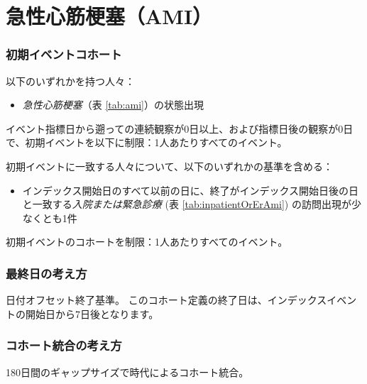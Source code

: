 \documentclass[
  11pt]{book}
\providecommand{\tightlist}{%
  \setlength{\itemsep}{0pt}\setlength{\parskip}{0pt}}
\theoremstyle{definition}
\theoremstyle{definition}
\theoremstyle{definition}
\theoremstyle{definition}
\theoremstyle{remark}
\begin{document}
\section{急性心筋梗塞（AMI）}\label{Ami}

\subsubsection*{初期イベントコホート}\label{ux521dux671fux30a4ux30d9ux30f3ux30c8ux30b3ux30dbux30fcux30c8-1}

以下のいずれかを持つ人々：

\begin{itemize}
\tightlist
\item
  \emph{急性心筋梗塞}（表 \ref{tab:ami}）の状態出現
\end{itemize}

イベント指標日から遡っての連続観察が0日以上、および指標日後の観察が0日で、初期イベントを以下に制限：1人あたりすべてのイベント。

初期イベントに一致する人々について、以下のいずれかの基準を含める：

\begin{itemize}
\tightlist
\item
  インデックス開始日のすべて以前の日に、終了がインデックス開始日後の日と一致する\emph{入院または緊急診療} (表 \ref{tab:inpatientOrErAmi}) の訪問出現が少なくとも1件
\end{itemize}

初期イベントのコホートを制限：1人あたりすべてのイベント。

\subsubsection*{最終日の考え方}\label{ux6700ux7d42ux65e5ux306eux8003ux3048ux65b9-1}

日付オフセット終了基準。
このコホート定義の終了日は、インデックスイベントの開始日から7日後となります。

\subsubsection*{コホート統合の考え方}\label{ux30b3ux30dbux30fcux30c8ux7d71ux5408ux306eux8003ux3048ux65b9-1}

180日間のギャップサイズで時代によるコホート統合。
\end{document}
